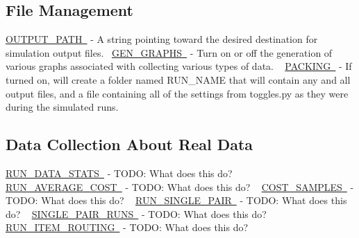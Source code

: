\hypertarget{toggles_file}{}\subsection{File Management}\label{toggles_file}
\mbox{\hyperlink{namespacedynamicfilterapp_1_1toggles_a04644ded1d5e3fc8bd58a411209b7886}{O\+U\+T\+P\+U\+T\+\_\+\+P\+A\+TH }} -\/ A string pointing toward the desired destination for simulation output files.~\newline
 \mbox{\hyperlink{namespacedynamicfilterapp_1_1toggles_a57c1e3f291181d680f3ee118fa5c4ab8}{G\+E\+N\+\_\+\+G\+R\+A\+P\+HS }} -\/ Turn on or off the generation of various graphs associated with collecting various types of data. ~\newline
 \mbox{\hyperlink{namespacedynamicfilterapp_1_1toggles_a23735ccf05ebd9212e9ebaab8f652507}{P\+A\+C\+K\+I\+NG }} -\/ If turned on, will create a folder named R\+U\+N\+\_\+\+N\+A\+ME that will contain any and all output files, and a file containing all of the settings from toggles.\+py as they were during the simulated runs. ~\newline
 \hypertarget{toggles_data}{}\subsection{Data Collection About Real Data}\label{toggles_data}
\mbox{\hyperlink{namespacedynamicfilterapp_1_1toggles_a36bc09bc8fbde0df2ea1c5d9ed0cf135}{R\+U\+N\+\_\+\+D\+A\+T\+A\+\_\+\+S\+T\+A\+TS }} -\/ T\+O\+DO\+: What does this do? ~\newline
 \mbox{\hyperlink{namespacedynamicfilterapp_1_1toggles_a21f2f0f4c6df7faefb843dd318af3452}{R\+U\+N\+\_\+\+A\+V\+E\+R\+A\+G\+E\+\_\+\+C\+O\+ST }} -\/ T\+O\+DO\+: What does this do? ~\newline
 \mbox{\hyperlink{namespacedynamicfilterapp_1_1toggles_a134ac33ad7706cd6a24fda5b63c73c65}{C\+O\+S\+T\+\_\+\+S\+A\+M\+P\+L\+ES }} -\/ T\+O\+DO\+: What does this do? ~\newline
 \mbox{\hyperlink{namespacedynamicfilterapp_1_1toggles_ab61137c2de5f99b09789a6e76b7cda4c}{R\+U\+N\+\_\+\+S\+I\+N\+G\+L\+E\+\_\+\+P\+A\+IR }} -\/ T\+O\+DO\+: What does this do? ~\newline
 \mbox{\hyperlink{namespacedynamicfilterapp_1_1toggles_a70d4dc65db288020e23ca213cd97c0f8}{S\+I\+N\+G\+L\+E\+\_\+\+P\+A\+I\+R\+\_\+\+R\+U\+NS }} -\/ T\+O\+DO\+: What does this do? ~\newline
 \mbox{\hyperlink{namespacedynamicfilterapp_1_1toggles_a41d76408f27c5889dc3f40f066583a9f}{R\+U\+N\+\_\+\+I\+T\+E\+M\+\_\+\+R\+O\+U\+T\+I\+NG }} -\/ T\+O\+DO\+: What does this do? ~\newline

